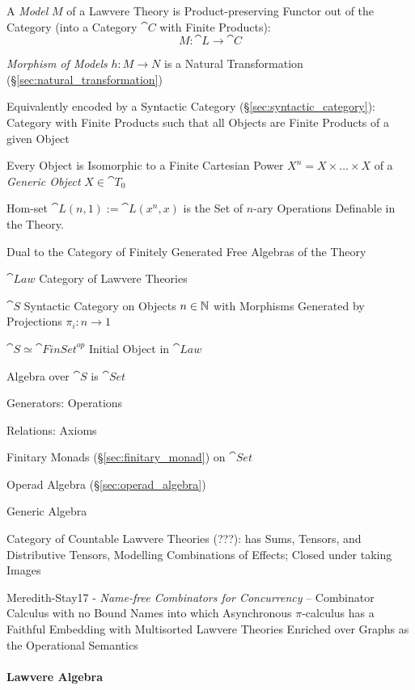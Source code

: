 A \emph{Model} $M$ of a Lawvere Theory is Product-preserving Functor
out of the Category (into a Category $\cat{C}$ with Finite Products):
\[
  M : \cat{L} \rightarrow \cat{C}
\]

\emph{Morphism of Models} $h : M \rightarrow N$ is a Natural
Transformation (\S\ref{sec:natural_transformation})

Equivalently encoded by a Syntactic Category
(\S\ref{sec:syntactic_category}): Category with Finite Products such
that all Objects are Finite Products of a given Object

Every Object is Isomorphic to a Finite Cartesian Power $X^n = X \times
\ldots \times X$ of a \emph{Generic Object} $X \in \cat{T}_0$

Hom-set $\cat{L}(n,1) := \cat{L}(x^n,x)$ is the Set of $n$-ary
Operations Definable in the Theory.

Dual to the Category of Finitely Generated Free Algebras of the Theory

$\cat{Law}$ Category of Lawvere Theories

$\cat{S}$ Syntactic Category on Objects $n \in \mathbb{N}$ with Morphisms
Generated by Projections $\pi_i : n \rightarrow 1$

$\cat{S} \simeq \cat{FinSet}^{op}$ Initial Object in $\cat{Law}$

Algebra over $\cat{S}$ is $\cat{Set}$

Generators: Operations

Relations: Axioms

Finitary Monads (\S\ref{sec:finitary_monad}) on $\cat{Set}$

Operad Algebra (\S\ref{sec:operad_algebra})

Generic Algebra

Category of Countable Lawvere Theories (???): has Sums, Tensors, and
Distributive Tensors, Modelling Combinations of Effects; Closed under
taking Images \cite{hyland-power06}

Meredith-Stay17 - \emph{Name-free Combinators for Concurrency} --
Combinator Calculus with no Bound Names into which Asynchronous
$\pi$-calculus has a Faithful Embedding with Multisorted Lawvere
Theories Enriched over Graphs as the Operational Semantics



\paragraph{Lawvere Algebra}\label{sec:lawvere_algebra}\hfill

